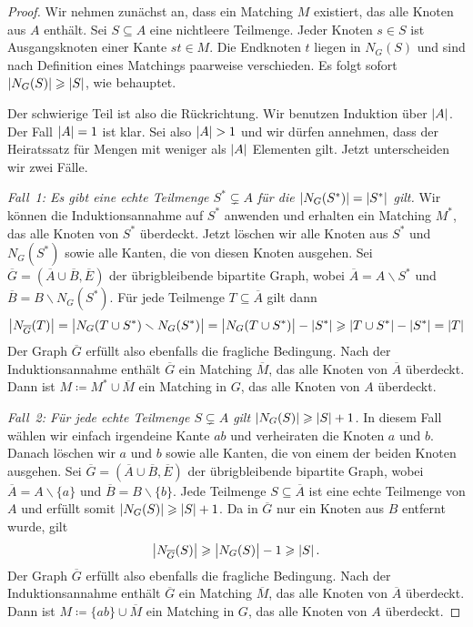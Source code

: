 \begin{proof}
	Wir nehmen zunächst an, dass ein Matching  $M$ existiert, das alle Knoten aus $A$ enthält. Sei $S\subseteq A$ eine nichtleere Teilmenge. Jeder Knoten $s\in S$ ist Ausgangsknoten einer Kante $st\in M$. Die Endknoten $t$ liegen in $N_G(S)$ und sind nach Definition eines Matchings paarweise verschieden. Es folgt sofort $\abs {N_G(S)}\geqslant \abs{S}$, wie behauptet.
	
	Der schwierige Teil ist also die Rückrichtung.
	Wir benutzen Induktion über $\abs{A}$. Der Fall $\abs{A}=1$ ist klar. Sei also $\abs{A}>1$ und wir dürfen annehmen, dass der Heiratssatz für Mengen mit weniger als $\abs{A}$ Elementen gilt. Jetzt unterscheiden wir zwei Fälle.
	
	\emph{Fall~1: Es gibt eine echte Teilmenge $S^*\subsetneq A$ für die $\abs {N_G(S^*)}=\abs{S^*}$ gilt.} Wir können die Induktionsannahme auf $S^*$ anwenden und erhalten ein Matching $M^*$, das alle Knoten von $S^*$ überdeckt. Jetzt löschen wir alle Knoten aus $S^*$ und $N_G(S^*)$ sowie alle Kanten, die von diesen Knoten ausgehen. Sei $\overline{G}=(\overline{A}\cup \overline{B}, \overline{E})$ der übrigbleibende bipartite Graph, wobei $\overline{A}=A\smallsetminus S^*$ und $\overline{B}=B\smallsetminus N_G(S^*)$. Für jede Teilmenge $T\subseteq \overline{A}$ gilt dann
	\begin{equation*}
		\abs[\big]{N_{\overline{G}}(T)}=\abs[\big]{N_G(T\cup S^*)\smallsetminus N_G(S^*)}=\abs[\big]{N_G(T\cup S^*)}-\abs*{S^*}\geqslant \abs*{T\cup S^*}-\abs*{S^*}=\abs*{T}
	\end{equation*}
	Der Graph $\overline{G}$ erfüllt also ebenfalls die fragliche Bedingung. Nach der Induktionsannahme enthält $\overline{G}$ ein Matching $\overline{M}$, das alle Knoten von $\overline{A}$ überdeckt. Dann ist $M\coloneqq M^*\cup \overline{M}$ ein Matching in $G$, das alle Knoten von $A$ überdeckt.
	
	\emph{Fall~2: Für jede echte Teilmenge $S\subsetneq A$ gilt $\abs{N_G(S)}\geqslant \abs{S}+1$.} In diesem Fall wählen wir einfach irgendeine Kante $ab$ und verheiraten die Knoten $a$ und $b$. Danach löschen wir $a$ und $b$ sowie alle Kanten, die von einem der beiden Knoten ausgehen. Sei $\overline{G}=(\overline{A}\cup \overline{B},\overline{E})$ der übrigbleibende bipartite Graph, wobei $\overline{A}=A\smallsetminus \{a\}$ und $\overline{B}=B\smallsetminus \{b\}$. Jede Teilmenge $S\subseteq \overline{A}$ ist eine echte Teilmenge von $A$ und erfüllt somit $\abs{N_G(S)}\geqslant \abs{S}+1$. Da in $\overline{G}$ nur ein Knoten aus $B$ entfernt wurde, gilt
	\begin{equation*}
		\abs[\big]{N_{\overline{G}}(S)}\geqslant \abs[\big]{N_G(S)}-1\geqslant \abs*{S}\,.
	\end{equation*}
	Der Graph $\overline{G}$ erfüllt also ebenfalls die fragliche Bedingung. Nach der Induktionsannahme enthält $\overline{G}$ ein Matching $\overline{M}$, das alle Knoten von $\overline{A}$ überdeckt. Dann ist $M\coloneqq \{ab\}\cup \overline{M}$ ein Matching in $G$, das alle Knoten von $A$ überdeckt.
\end{proof}

